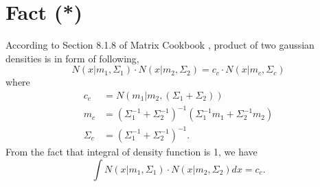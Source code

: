 \documentclass[fontsize=12pt]{article}
\begin{document}
\section*{Fact (*)}

According to Section 8.1.8 of Matrix Cookbook \citep{cookbook}, product of two gaussian densities is in form of following,
\begin{equation*}
N(x|m_1,\Sigma_1) \cdot N(x|m_2, \Sigma_2) = c_c \cdot N(x|m_c, \Sigma_c)
\end{equation*}
where
\begin{align*}
c_c &= N(m_1 | m_2, (\Sigma_1+\Sigma_2)) \\ 
m_c &= (\Sigma_1^{-1} + \Sigma_2^{-1})^{-1} (\Sigma_1^{-1} m_1 + \Sigma_2^{-1} m_2) \\
\Sigma_c &= (\Sigma_1^{-1} + \Sigma_2^{-1})^{-1}.
\end{align*}
From the fact that integral of density function is 1, we have
\begin{equation*}
\int N(x|m_1, \Sigma_1) \cdot N(x|m_2,\Sigma_2) dx = c_c .
\end{equation*}



\end{document}
